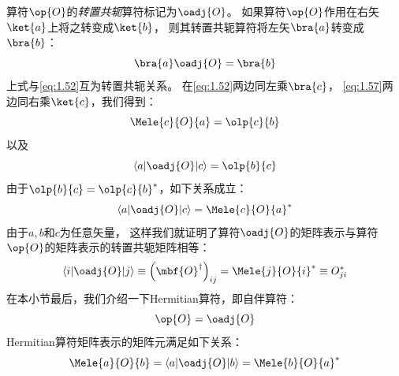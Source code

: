 算符$\op{O}$的\emph{转置共轭}算符标记为$\oadj{O}$。
如果算符$\op{O}$作用在右矢$\ket{a}$上将之转变成$\ket{b}$，
则其转置共轭算符将左矢$\bra{a}$转变成$\bra{b}$：
\begin{equation}
 \bra{a}\oadj{O} = \bra{b}
 \label{eq:1.57}
\end{equation}
上式与\autoref{eq:1.52}互为转置共轭关系。
在\autoref{eq:1.52}两边同左乘$\bra{c}$，
\autoref{eq:1.57}两边同右乘$\ket{c}$，我们得到：
\[
\Mele{c}{O}{a} = \olp{c}{b}
\]
以及
\[
\left\langle a\middle\vert \oadj{O}\middle\vert c\right\rangle = \olp{b}{c}
\]
由于$\olp{b}{c} = {\olp{c}{b}}^\ast$，如下关系成立：
\begin{equation}
 \left\langle a\middle\vert \oadj{O}\middle\vert c\right\rangle = {\Mele{c}{O}{a}}^\ast
 \label{eq:1.58}
\end{equation}
由于$a, b$和$c$为任意矢量，
这样我们就证明了算符$\oadj{O}$的矩阵表示与算符$\op{O}$的矩阵表示的转置共轭矩阵相等：
\begin{equation}
 \left\langle i\middle\vert \oadj{O}\middle\vert j\right\rangle \equiv \left(\mbf{O}^\dagger\right)_{ij} = {\Mele{j}{O}{i}}^\ast \equiv O_{ji}^\ast
 \label{eq:1.59}
\end{equation}
在本小节最后，我们介绍一下Hermitian算符，即自伴算符：
\begin{equation}
 \op{O} = \oadj{O}
 \label{eq:1.60}
\end{equation}
Hermitian算符矩阵表示的矩阵元满足如下关系：
\begin{equation}
 \Mele{a}{O}{b} = \left\langle a\middle\vert \oadj{O}\middle\vert b\right\rangle = {\Mele{b}{O}{a}}^\ast
 \label{eq:1.61}
\end{equation}


